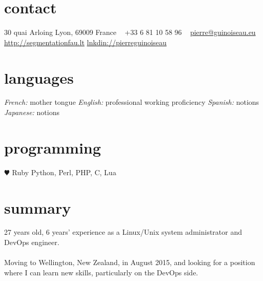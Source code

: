 \documentclass[]{friggeri-cv} %
\begin{document}



\begin{aside} %
\section{contact}
30 quai Arloing
Lyon, 69009
France
~
+33 6 81 10 58 96
~
\href{mailto:pierre@guinoiseau.eu}{pierre@guinoiseau.eu}
\href{http://segmentationfau.lt}{http://segmentationfau.lt}
\href{http://linkedin.com/in/pierreguinoiseau}{lnkdin://pierreguinoiseau}
\section{languages}
\textit{French:} mother tongue
\textit{English:} professional working proficiency
\textit{Spanish:} notions
\textit{Japanese:} notions
\section{programming}
{\color{red} $\varheartsuit$} Ruby
Python, Perl, PHP, C, Lua
\end{aside}


\section{summary}

27 years old, 6 years' experience as a Linux/Unix system administrator and DevOps engineer. \\
\\
Moving to Wellington, New Zealand, in August 2015, and looking for a position where I can learn new skills, particularly on the DevOps side. \\

\end{document}
